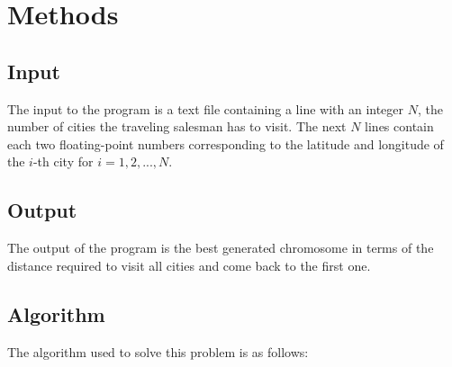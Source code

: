 \documentclass[twoside,twocolumn]{article}
\begin{document}

\section{Methods}

\subsection{Input}
The input to the program is a text file containing a line with an integer $N$, the number of cities the traveling salesman has to visit. The next $N$ lines contain each two floating-point numbers corresponding to the latitude and longitude of the $i$-th city for $i = 1,2,...,N$.

\subsection{Output}
The output of the program is the best generated chromosome in terms of the distance required to visit all cities and come back to the first one.

\subsection{Algorithm} 
The algorithm used to solve this problem is as follows:
\end{document}
